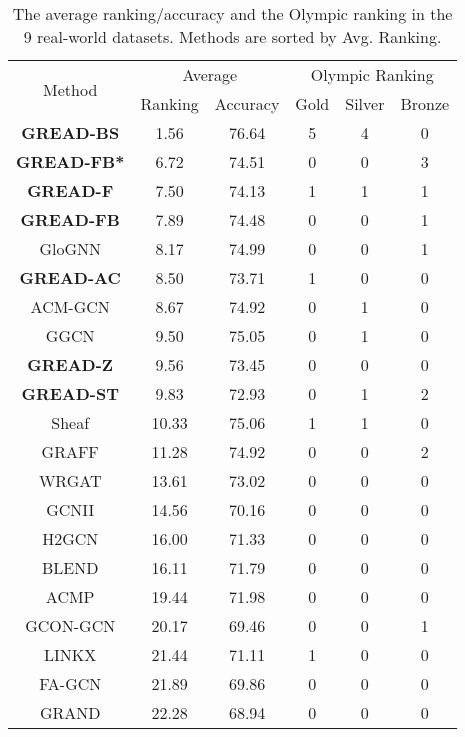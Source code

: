 \documentclass{article}
\theoremstyle{plain}
\theoremstyle{definition}
\theoremstyle{remark}
\begin{document}
\begin{table}[ht]
    \centering
    \caption{The average ranking/accuracy and the Olympic ranking in the 9 real-world datasets. Methods are sorted by Avg. Ranking.}
    \begin{tabular}{c cc ccc} \toprule
        \multirow{2}{*}{Method} & \multicolumn{2}{c}{Average} 
                                                           & \multicolumn{3}{c}{Olympic Ranking}\\  \cmidrule(lr){2-3}\cmidrule(lr){4-6}
                 & Ranking & Accuracy                      & Gold & Silver & Bronze\\ \midrule
        \textbf{GREAD-BS} 
                 & 1.56   & 76.64 & 5 & 4 & 0\\
        \textbf{GREAD-FB*}
                 & 6.72   & 74.51 & 0 & 0 & 3\\
        \textbf{GREAD-F}  
                 & 7.50   & 74.13 & 1 & 1 & 1\\
        \textbf{GREAD-FB} 
                 & 7.89   & 74.48 & 0 & 0 & 1\\
        GloGNN   & 8.17   & 74.99 & 0 & 0 & 1\\
        \textbf{GREAD-AC} 
                 & 8.50   & 73.71 & 1 & 0 & 0\\ 
        ACM-GCN  & 8.67   & 74.92 & 0 & 1 & 0\\
        GGCN     & 9.50   & 75.05 & 0 & 1 & 0\\
        \textbf{GREAD-Z}  
                 & 9.56   & 73.45 & 0 & 0 & 0\\
        \textbf{GREAD-ST} 
                 & 9.83   & 72.93 & 0 & 1 & 2\\
        Sheaf	 & 10.33  & 75.06 & 1 & 1 & 0\\
        GRAFF	 & 11.28  & 74.92 & 0 & 0 & 2\\
        WRGAT	 & 13.61  & 73.02 & 0 & 0 & 0\\
        GCNII	 & 14.56  & 70.16 & 0 & 0 & 0\\
        H2GCN	 & 16.00  & 71.33 & 0 & 0 & 0\\
        BLEND	 & 16.11  & 71.79 & 0 & 0 & 0\\
        ACMP     & 19.44  & 71.98 & 0 & 0 & 0\\
        GCON-GCN & 20.17  & 69.46 & 0 & 0 & 1\\
        LINKX	 & 21.44  & 71.11 & 1 & 0 & 0\\
        FA-GCN	 & 21.89  & 69.86 & 0 & 0 & 0\\
        GRAND    & 22.28  & 68.94 & 0 & 0 & 0\\

\end{tabular}
\end{table}
\end{document}
